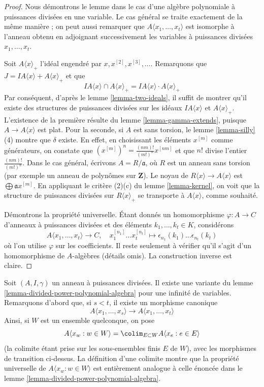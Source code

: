 \begin{proof}
Nous démontrons le lemme dans le cas d'une algèbre polynomiale à puissances
divisées en une variable. Le cas général se traite exactement de la même
manière ; on peut aussi remarquer que $A\langle x_1, \ldots, x_t\rangle$
est isomorphe à l'anneau obtenu en adjoignant successivement les variables à
puissances divisées $x_1, \ldots, x_t$.

\medskip\noindent
Soit $A\langle x \rangle_{+}$ l'idéal engendré par
$x, x^{[2]}, x^{[3]}, \ldots$. Remarquons que
$J = IA\langle x \rangle + A\langle x \rangle_{+}$ et que
$$
IA\langle x \rangle \cap A\langle x \rangle_{+} =
IA\langle x \rangle \cdot A\langle x \rangle_{+}
$$
Par conséquent, d'après le lemme \ref{lemma-two-ideals}, il suffit de montrer
qu'il existe des structures de puissances divisées sur les idéaux
$IA\langle x \rangle$ et $A\langle x \rangle_{+}$. L'existence de la
première résulte du lemme \ref{lemma-gamma-extends}, puisque
$A \to A\langle x \rangle$ est plat. Pour la seconde, si $A$ est sans
torsion, le lemme \ref{lemma-silly} (4) montre que $\delta$ existe. En effet,
en choisissant les éléments $x^{[m]}$ comme générateurs, on constate que
$(x^{[m]})^n = \frac{(nm)!}{(m!)^n} x^{[nm]}$
et que $n!$ divise l'entier $\frac{(nm)!}{(m!)^n}$.
Dans le cas général, écrivons $A = R/\mathfrak a$, où $R$ est un anneau
sans torsion (par exemple un anneau de polynômes sur $\mathbf{Z}$). Le noyau
de $R\langle x \rangle \to A\langle x \rangle$ est
$\bigoplus \mathfrak a x^{[m]}$. En appliquant le critère (2)(c) du
lemme \ref{lemma-kernel}, on voit que la structure de puissances divisées
sur $R\langle x \rangle_{+}$ se transporte à $A\langle x \rangle$, comme
souhaité.

\medskip\noindent
Démontrons la propriété universelle. Étant donnés un homomorphisme
$\varphi : A \to C$ d'anneaux à puissances divisées et des éléments
$k_1, \ldots, k_t \in K$, considérons
$$
A\langle x_1, \ldots, x_t \rangle \to C,\quad
x_1^{[n_1]} \ldots x_t^{[n_t]} \longmapsto
\epsilon_{n_1}(k_1) \ldots \epsilon_{n_t}(k_t)
$$
où l'on utilise $\varphi$ sur les coefficients. Il reste seulement à
vérifier qu'il s'agit d'un homomorphisme de $A$-algèbres (détails omis).
La construction inverse est claire.
\end{proof}

\begin{remark}
\label{remark-divided-power-polynomial-algebra}
Soit $(A, I, \gamma)$ un anneau à puissances divisées. Il existe une variante
du lemme \ref{lemma-divided-power-polynomial-algebra} pour une infinité de
variables. Remarquons d'abord que, si $s < t$, il existe un morphisme
canonique
$$
A\langle x_1, \ldots, x_s \rangle \to A\langle x_1, \ldots, x_t\rangle
$$
Ainsi, si $W$ est un ensemble quelconque, on pose
$$
A\langle x_w: w \in W\rangle =
\colim_{E \subset W} A\langle x_e:e \in E\rangle
$$
(la colimite étant prise sur les sous-ensembles finis $E$ de $W$), avec les
morphismes de transition ci-dessus. La définition d'une colimite montre que
la propriété universelle de $A\langle x_w: w \in W\rangle$ est entièrement
analogue à celle énoncée dans le
lemme \ref{lemma-divided-power-polynomial-algebra}.
\end{remark}

